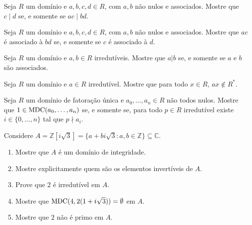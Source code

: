 \begin{exer}
    Seja $R$ um domínio e $a, b, c, d \in R$, com $a, b$ não nulos e associados. Mostre que $c\mid d$ se, e somente se $ac\mid bd$.
\end{exer}
\begin{exer}
    Seja $R$ um domínio e $a, b, c, d \in R$, com $a, b$ não nulos e associados. Mostre que $ac$ é associado à $bd$ se, e somente se $c$ é associado à $d$.
\end{exer}

\begin{exer}
    Seja $R$ um domínio e $a, b \in R$ irredutíveis. Mostre que $a|b$ se, e somente se $a$ e $b$ são associados.
\end{exer}
\begin{exer}
    Seja $R$ um domínio e $a \in R$ irredutível. Mostre que para todo $x \in R$, $ax\notin R^*$.
\end{exer}

\begin{exer}
    Seja $R$ um domínio de fatoração única e $a_0, \dots, a_n \in R$ não todos nulos. Mostre que $1 \in \operatorname{MDC}(a_0, \dots, a_n)$ se, e somente se, para todo $p \in R$ irredutível existe $i \in \{0, \dots, n\}$ tal que $p\nmid a_i$.
\end{exer}

\begin{exer}
    Considere $A=\mathbb Z[i\sqrt 3]=\{a+bi\sqrt 3: a, b \in \mathbb Z\}\subseteq \mathbb C$.
    \begin{enumerate}[label=\alph*)]
    \item Mostre que $A$ é um domínio de integridade.
    \item Mostre explicitamente quem são os elementos invertíveis de $A$.
    \item Prove que $2$ é irredutível em $A$.
    \item Mostre que $\operatorname{MDC}(4, 2(1+i\sqrt 3))= \emptyset$ em $A$.
    \item Mostre que $2$ não é primo em $A$.
    \end{enumerate}
\end{exer}
